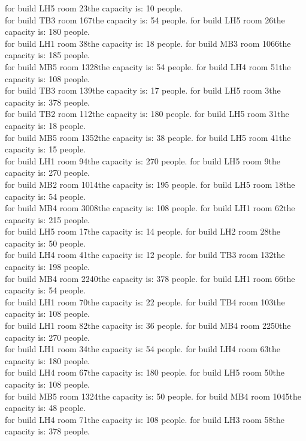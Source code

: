 \footnotesize
for build LH5 room 23the capacity is: 10 people.\\
for build TB3 room 167the capacity is: 54 people.
for build LH5 room 26the capacity is: 180 people.\\
for build LH1 room 38the capacity is: 18 people.
for build MB3 room 1066the capacity is: 185 people.\\
for build MB5 room 1328the capacity is: 54 people.
for build LH4 room 51the capacity is: 108 people.\\
for build TB3 room 139the capacity is: 17 people.
for build LH5 room 3the capacity is: 378 people.\\
for build TB2 room 112the capacity is: 180 people.
for build LH5 room 31the capacity is: 18 people.\\
for build MB5 room 1352the capacity is: 38 people.
for build LH5 room 41the capacity is: 15 people.\\
for build LH1 room 94the capacity is: 270 people.
for build LH5 room 9the capacity is: 270 people.\\
for build MB2 room 1014the capacity is: 195 people.
for build LH5 room 18the capacity is: 54 people.\\
for build MB4 room 3008the capacity is: 108 people.
for build LH1 room 62the capacity is: 215 people.\\
for build LH5 room 17the capacity is: 14 people.
for build LH2 room 28the capacity is: 50 people.\\
for build LH4 room 41the capacity is: 12 people.
for build TB3 room 132the capacity is: 198 people.\\
for build MB4 room 2240the capacity is: 378 people.
for build LH1 room 66the capacity is: 54 people.\\
for build LH1 room 70the capacity is: 22 people.
for build TB4 room 103the capacity is: 108 people.\\
for build LH1 room 82the capacity is: 36 people.
for build MB4 room 2250the capacity is: 270 people.\\
for build LH1 room 34the capacity is: 54 people.
for build LH4 room 63the capacity is: 180 people.\\
for build LH4 room 67the capacity is: 180 people.
for build LH5 room 50the capacity is: 108 people.\\
for build MB5 room 1324the capacity is: 50 people.
for build MB4 room 1045the capacity is: 48 people.\\
for build LH4 room 71the capacity is: 108 people.
for build LH3 room 58the capacity is: 378 people.\\
